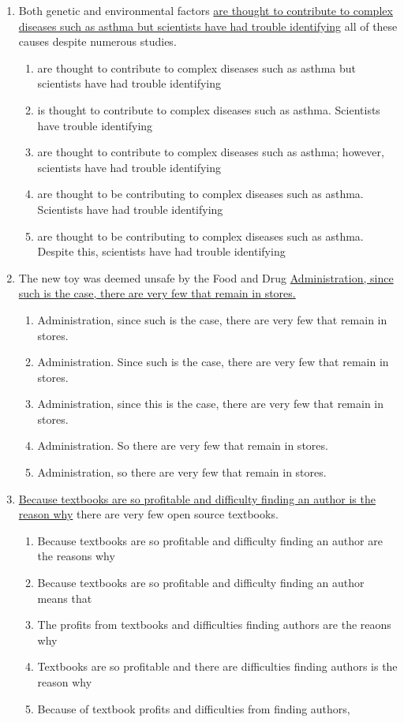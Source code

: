\begin{enumerate}
\item Both genetic and environmental factors \ul{are thought to contribute to complex diseases such as asthma but scientists have had trouble identifying} all of these causes despite numerous studies. 

\bigskip
\begin{enumerate}[label=(\Alph*)]
\item are thought to contribute to complex diseases such as asthma but scientists have had trouble identifying
\item is thought to contribute to complex diseases such as asthma. Scientists have trouble identifying    
\item are thought to contribute to complex diseases such as asthma; however, scientists have had trouble identifying
\item are thought to be contributing to complex diseases such as asthma. Scientists have had trouble identifying
\item are thought to be contributing to complex diseases such as asthma. Despite this, scientists have had trouble identifying
\end{enumerate}


\item The new toy was deemed unsafe by the Food and Drug \ul{Administration, since such is the case, there are very few that remain in stores.}

\bigskip
\begin{enumerate}[label=(\Alph*)]
\item Administration, since such is the case, there are very few that remain in stores.
\item Administration. Since such is the case, there are very few that remain in stores. 
\item Administration, since this is the case, there are very few that remain in stores.
\item Administration. So there are very few that remain in stores. 
\item Administration, so there are very few that remain in stores.
\end{enumerate}


\item \ul{Because textbooks are so profitable and difficulty finding an author is the reason why} there are very few open source textbooks. 

\bigskip
\begin{enumerate}[label=(\Alph*)]
\item Because textbooks are so profitable and difficulty finding an author are the reasons why
\item Because textbooks are so profitable and difficulty finding an author means that
\item The profits from textbooks and difficulties finding authors are the reaons why
\item Textbooks are so profitable and there are difficulties finding authors is the reason why
\item Because of textbook profits and difficulties from finding authors,
\end{enumerate}



\end{enumerate}

